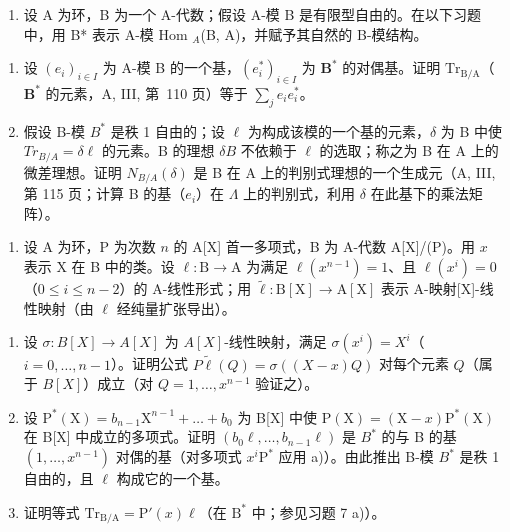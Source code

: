 \begin{enumerate}
\def\labelenumi{\arabic{enumi})}
\setcounter{enumi}{6}
\tightlist
\item
  设 A 为环，B 为一个 A-代数；假设 A-模 B 是有限型自由的。在以下习题中，用 B* 表示 A-模 Hom \(_{A}\)(B, A)，并赋予其自然的 B-模结构。
\end{enumerate}

\begin{enumerate}
\def\labelenumi{\alph{enumi})}
\item
  设 \((e_i)_{i\in I}\) 为 A-模 B 的一个基，\((e_i^*)_{i\in I}\) 为 \(\mathbf{B}^*\) 的对偶基。证明 \(\mathrm{Tr}_{\mathrm{B / A}}\)（\(\mathbf{B}^*\) 的元素，A, III, 第~110 页）等于 \(\sum_{j}e_{i}e_{i}^{*}\)。
\item
  假设 B-模 \(B^{*}\) 是秩 1 自由的；设 \(\ell\) 为构成该模的一个基的元素，\(\delta\) 为 B 中使 \(Tr_{B/A} = \delta\ell\) 的元素。B 的理想 \(\delta B\) 不依赖于 \(\ell\) 的选取；称之为 B 在 A 上的微差理想。证明 \(N_{B/A}(\delta)\) 是 B 在 A 上的判别式理想的一个生成元（A, III, 第 115 页；计算 B 的基（\(e_{i}\)）在 \(\Lambda\) 上的判别式，利用 \(\delta\) 在此基下的乘法矩阵）。
\end{enumerate}

\begin{enumerate}
\def\labelenumi{\arabic{enumi})}
\setcounter{enumi}{7}
\tightlist
\item
  设 A 为环，P 为次数 \(n\) 的 A{[}X{]} 首一多项式，B 为 A-代数 A{[}X{]}/(P)。用 \(x\) 表示 X 在 B 中的类。设 \(\ell: \mathrm{B} \to \mathrm{A}\) 为满足 \(\ell(x^{n-1}) = 1\)、且 \(\ell(x^i) = 0\)（\(0 \leqslant i \leqslant n-2\)）的 A-线性形式；用 \(\tilde{\ell}: \mathrm{B}[\mathrm{X}] \to \mathrm{A}[\mathrm{X}]\) 表示 A-映射{[}X{]}-线性映射（由 \(\ell\) 经纯量扩张导出）。
\end{enumerate}

\begin{enumerate}
\def\labelenumi{\alph{enumi})}
\item
  设 \(\sigma : B[X] \to A[X]\) 为 \(A[X]\)-线性映射，满足 \(\sigma(x^i) = X^i\)（\(i = 0, \ldots, n - 1\)）。证明公式 \(P\tilde{\ell}(Q) = \sigma((X - x)Q)\) 对每个元素 \(Q\)（属于 \(B[X]\)）成立（对 \(Q = 1, \ldots, x^{n-1}\) 验证之）。
\item
  设 \(\mathrm{P}^{*}(\mathrm{X}) = b_{n-1}\mathrm{X}^{n-1} + \ldots + b_{0}\) 为 B{[}X{]} 中使 \(\mathrm{P}(\mathrm{X}) = (\mathrm{X} - x)\mathrm{P}^{*}(\mathrm{X})\) 在 B{[}X{]} 中成立的多项式。证明 \((b_{0}\ell, \ldots, b_{n-1}\ell)\) 是 \(B^{*}\) 的与 B 的基 \((1, \ldots, x^{n-1})\) 对偶的基（对多项式 \(x^{i}\mathrm{P}^{*}\) 应用 a)）。由此推出 B-模 \(B^{*}\) 是秩 1 自由的，且 \(\ell\) 构成它的一个基。
\item
  证明等式 \(\mathrm{Tr}_{\mathrm{B / A}} = \mathrm{P}'(x)\ell\)（在 \(\mathrm{B}^*\) 中；参见习题 7 a)）。
\end{enumerate}

